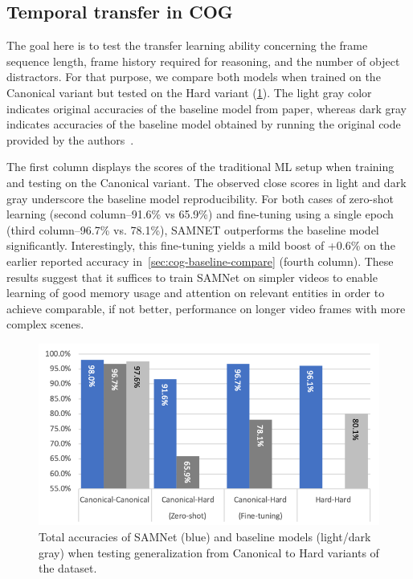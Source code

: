 \newpage
\subsection{Temporal transfer in COG}
\label{sec:temporal}

The goal here is to test the transfer learning ability concerning the frame sequence length, frame history required
for reasoning, and the number of object distractors.
For that purpose, we compare both models when trained on the Canonical variant but tested on the 
Hard variant (\cref{fig:samnet_cog_overall_transfer}).
The light gray color indicates original accuracies of the baseline model from paper, 
whereas dark gray indicates accuracies of the baseline model
obtained by running the original code provided by the authors~\cite{yang2018implement}.

The first column displays the scores of the traditional ML setup when training and testing on the Canonical variant. 
The observed close scores in light and dark gray underscore the baseline model reproducibility.
For both cases of zero-shot learning (second column--91.6\% vs 65.9\%) and fine-tuning using a single epoch 
(third column--96.7\% vs. 78.1\%), SAMNET outperforms the baseline model significantly.
Interestingly, this fine-tuning yields a mild boost of +0.6\% on the earlier reported accuracy 
in~\cref{sec:cog-baseline-compare} (fourth column).
These results suggest that it suffices to train SAMNet on simpler videos 
to enable learning of good memory usage and attention on relevant entities  
in order to achieve comparable, if not better, 
performance on longer video frames with more complex scenes.

\begin{figure}[htbp]
	\centering
	\includegraphics[width=\columnwidth]{../results/samnet_cog_overall_transfer.png}
	\caption{Total accuracies of SAMNet (blue) and baseline models (light/dark gray) when testing generalization from Canonical to Hard variants of the dataset.}
	\label{fig:samnet_cog_overall_transfer}
\end{figure}


